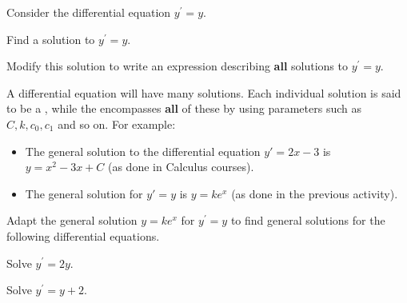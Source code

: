 \begin{applicationActivities}
\begin{activity}{15}
Consider the differential equation \(y^\prime=y\).
\begin{subactivity}
Find a solution to \(y^{\prime}=y\).
\end{subactivity}
\begin{subactivity}
Modify this solution to write an expression describing \textbf{all} solutions to \(y^{\prime}=y\).
\end{subactivity}
\end{activity}

\begin{definition}
A differential equation will have many solutions.
Each individual solution is said to be a ,
while the  encompasses \textbf{all} of these by using 
parameters such as \(C,k,c_0,c_1\) and so on. For example:

\begin{itemize}
\item The general solution to the differential equation \(y'=2x-3\) is \(y=x^2-3x+C\) (as done in
Calculus courses).
\item The general solution for \(y'=y\) is \(y=ke^x\) (as done in the previous activity). 
\end{itemize}

\end{definition}


\begin{activity}{15}
Adapt the general solution \(y=ke^x\) for \(y^\prime=y\) to find general solutions for
the following differential equations.
\begin{subactivity}
Solve \(y^{\prime}=2y\).
\end{subactivity}
\begin{subactivity}
Solve \(y^{\prime}=y+2\).
\end{subactivity}
\end{activity}

\end{applicationActivities}
